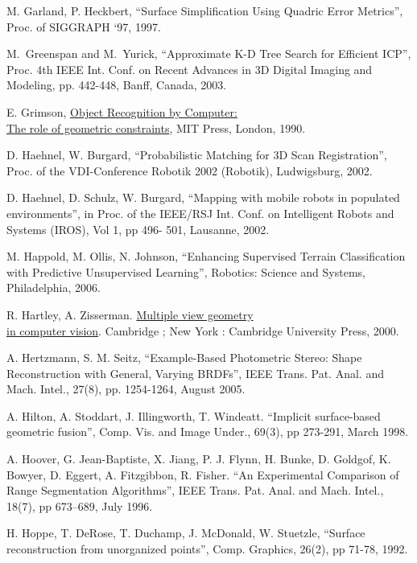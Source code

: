\documentclass[twocolumn,oneside]{book}
\begin{document}
\begin{thebibliography}{99}
M. Garland, P. Heckbert,
``Surface Simplification Using Quadric Error Metrics'',
Proc. of SIGGRAPH ‘97, 1997.

M.~Greenspan and M.~Yurick,
``Approximate K-D Tree Search for Efficient ICP'',
Proc. 4th IEEE Int. Conf. on Recent Advances in 3D Digital Imaging and Modeling,
pp. 442-448, Banff, Canada, 2003.

E. Grimson,
{\underline {Object Recognition by Computer:}}\\{\underline {The role of geometric constraints}},
MIT Press, London, 1990.

D. Haehnel, W. Burgard,
``Probabilistic Matching for 3D Scan Registration'',
Proc. of the VDI-Conference Robotik 2002 (Robotik), Ludwigsburg, 2002.

D. Haehnel, D. Schulz, W. Burgard,
``Mapping with mobile robots in populated environments'',
in Proc. of the IEEE/RSJ Int. Conf. on Intelligent
Robots and Systems (IROS), Vol 1, pp 496- 501, Lausanne, 2002.

M. Happold, M. Ollis, N. Johnson,
``Enhancing Supervised Terrain Classification with Predictive Unsupervised Learning'',
Robotics: Science and Systems, Philadelphia, 2006.

R. Hartley, A. Zisserman.
{\underline{Multiple view geometry}}\\{\underline{in computer vision}}.
Cambridge ; New York : Cambridge University Press, 2000.

A. Hertzmann, S. M. Seitz, 
``Example-Based Photometric Stereo: Shape Reconstruction with General, Varying BRDFs'',
IEEE Trans. Pat. Anal. and Mach. Intel., 27(8), pp. 1254-1264, August 2005.

A. Hilton, A. Stoddart, J. Illingworth, T. Windeatt.
``Implicit surface-based geometric fusion'',
Comp. Vis. and Image Under., 69(3), pp 273-291, March 1998.

A. Hoover, G. Jean-Baptiste, X. Jiang, P. J. Flynn,
H. Bunke, D. Goldgof, K. Bowyer,
D. Eggert, A. Fitzgibbon, R. Fisher.
``An Experimental Comparison of Range Segmentation Algorithms'',
IEEE Trans. Pat. Anal. and Mach. Intel., 18(7), pp 673--689, July 1996.

H. Hoppe, T. DeRose, T. Duchamp, J. McDonald, W. Stuetzle,
``Surface reconstruction from unorganized points'',
Comp. Graphics, 26(2), pp 71-78, 1992.


\end{thebibliography}
\end{document}
